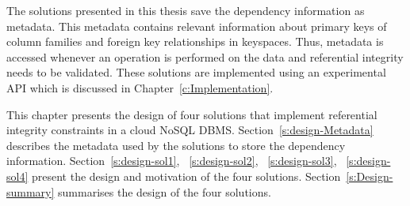 The solutions presented in this thesis save the dependency information as
metadata.    This metadata contains relevant  information about primary keys of
column families and foreign key relationships in keyspaces.   Thus,  metadata is
accessed whenever an operation is performed on the data and referential
integrity needs to be validated.  These solutions are implemented using an
experimental \ac{API} which is discussed in Chapter~\ref{c:Implementation}. 


This chapter presents the design of  four  solutions  that implement referential
integrity constraints in a cloud \ac{NoSQL} \ac{DBMS}.   
Section~\ref{s:design-Metadata} describes the metadata used by the solutions 
 to store the dependency information.    Section~\ref{s:design-sol1}, 
 ~\ref{s:design-sol2}, ~\ref{s:design-sol3}, ~\ref{s:design-sol4}  present
 the design and motivation of the four solutions. 
Section~\ref{s:Design-summary}
 summarises the design of the four solutions.   













